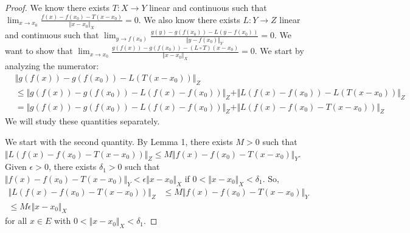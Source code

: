 \documentclass{report}
\begin{document}
\begin{proof}
    We know there exists $T : X \to Y$ linear and continuous such that $\lim_{x \to x_0} \frac{f(x) - f(x_0) - T(x - x_0)}{\Vert x - x_0 \Vert_X} = 0$. We also know there exists $L: Y \to Z$ linear and continuous such that $\lim_{y \to f(x_0)} \frac{g(y) - g(f(x_0)) - L(y - f(x_0))}{\Vert y - f(x_0) \Vert_Y} = 0$. We want to show that $\lim_{x \to x_0} \frac{g(f(x)) - g(f(x_0)) - (L \circ T)(x - x_0)}{\Vert x - x_0 \Vert_X} = 0$. We start by analyzing the numerator:
    \begin{align*}
        &\Vert g(f(x)) - g(f(x_0)) - L(T(x - x_0))\Vert_Z \\ 
        &\leq \Vert g(f(x)) - g(f(x_0)) - L(f(x) - f(x_0)) \Vert_Z + \Vert L(f(x) - f(x_0)) -L(T(x - x_0)) \Vert_Z \\
        &= \Vert g(f(x)) - g(f(x_0)) - L(f(x) - f(x_0)) \Vert_Z + \Vert L(f(x) - f(x_0) - T(x - x_0)) \Vert_Z 
    \end{align*}
    We will study these quantities separately. 
    
    We start with the second quantity. By Lemma 1, there exists $M > 0$ such that $\Vert L(f(x) - f(x_0) - T(x - x_0)) \Vert_Z \leq M \Vert f(x) - f(x_0) - T(x - x_0) \Vert_Y$. Given $\epsilon > 0$, there exists $\delta_1 > 0$ such that $\Vert f(x) - f(x_0) - T(x - x_0) \Vert_Y < \epsilon \Vert x-x_0 \Vert_X$ if $0 < \Vert x - x_0 \Vert_X < \delta_1$. So,
    \begin{align*}
        \Vert L(f(x) - f(x_0) - T(x - x_0)) \Vert_Z &\leq M \Vert f(x) - f(x_0) - T(x - x_0) \Vert_Y \\
        \leq M \epsilon \Vert x - x_0 \Vert_X
    \end{align*}
    for all $x \in E$ with $0 < \Vert x - x_0 \Vert_X < \delta_1$.


\end{proof}
\end{document}
